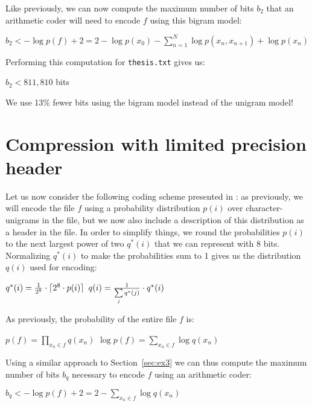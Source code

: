 \documentclass[10pt,a4paper,oneside,onecolumn]{article}
\DeclarePairedDelimiter{\ceil}{\lceil}{\rceil}
\newcommand*{\thesisTXT}{{\tt thesis.txt}\xspace}
\begin{document}
Like previously, we can now compute the maximum number of bits $b_2$ that an
arithmetic coder will need to encode $f$ using this bigram model:

\begin{center}
    $b_2 < -\log p(f) + 2
    = 2 - \log p(x_0) - \sum\limits_{n = 1}^{N} \log p(x_n, x_{n + 1}) + \log p(x_n)$
\end{center}

Performing this computation for \thesisTXT gives us:

\begin{center}
    $b_2 < 811,810$ bits
\end{center}

We use 13\% fewer bits using the bigram model instead of the unigram model!


\section{Compression with limited precision header}\label{sec:ex4}

Let us now consider the following coding scheme presented in \cite{it-assign}:
as previously, we will encode the file $f$ using a probability distribution
$p(i)$ over character-unigrams in the file, but we now also include a description
of this distribution as a header in the file. In order to simplify things, we
round the probabilities $p(i)$ to the next largest power of two $q^*(i)$ that we
can represent with 8 bits. Normalizing $q^*(i)$ to make the probabilities sum to
1 gives us the distribution $q(i)$ used for encoding:

\begin{center}
    $q^*(i) = {1 \over 2^8} \cdot \ceil{2^8 \cdot p(i)}$
    $q(i) = {1 \over \sum\limits_{j} q^*(j)} \cdot q^*(i)$
\end{center}

As previously, the probability of the entire file $f$ is:

\begin{center}
    $p(f) = \prod\limits_{x_n \in f} q(x_n)$
    $\log p(f) = \sum\limits_{x_n \in f} \log q(x_n)$
\end{center}

Using a similar approach to Section~\ref{sec:ex3} we can thus compute the
maximum number of bits $b_q$ necessary to encode $f$ using an arithmetic coder:

\begin{center}
    $b_q < -\log p(f) + 2
    = 2 - \sum\limits_{x_n \in f} \log q(x_n)$
\end{center}
\end{document}
